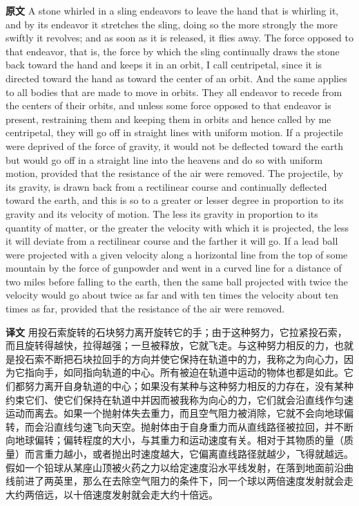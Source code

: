 \documentclass[UTF8,zihao=-4]{ctexart}
\begin{document}
\noindent\textbf{原文} A stone whirled in a sling endeavors to leave the hand that is whirling it, and by its endeavor it stretches the sling, doing so the more strongly the more swiftly it revolves; and as soon as it is released, it flies away. The force opposed to that endeavor, that is, the force by which the sling continually draws the stone back toward the hand and keeps it in an orbit, I call centripetal, since it is directed toward the hand as toward the center of an orbit. And the same applies to all bodies that are made to move in orbits. They all endeavor to recede from the centers of their orbits, and unless some force opposed to that endeavor is present, restraining them and keeping them in orbits and hence called by me centripetal, they will go off in straight lines with uniform motion. If a projectile were deprived of the force of gravity, it would not be deflected toward the earth but would go off in a straight line into the heavens and do so with uniform motion, provided that the resistance of the air were removed. The projectile, by its gravity, is drawn back from a rectilinear course and continually deflected toward the earth, and this is so to a greater or lesser degree in proportion to its gravity and its velocity of motion. The less its gravity in proportion to its quantity of matter, or the greater the velocity with which it is projected, the less it will deviate from a rectilinear course and the farther it will go. If a lead ball were projected with a given velocity along a horizontal line from the top of some mountain by the force of gunpowder and went in a curved line for a distance of two miles before falling to the earth, then the same ball projected with twice the velocity would go about twice as far and with ten times the velocity about ten times as far, provided that the resistance of the air were removed.
\par\noindent\textbf{译文} 用投石索旋转的石块努力离开旋转它的手；由于这种努力，它拉紧投石索，而且旋转得越快，拉得越强；一旦被释放，它就飞走。与这种努力相反的力，也就是投石索不断把石块拉回手的方向并使它保持在轨道中的力，我称之为向心力，因为它指向手，如同指向轨道的中心。所有被迫在轨道中运动的物体也都是如此。它们都努力离开自身轨道的中心；如果没有某种与这种努力相反的力存在，没有某种约束它们、使它们保持在轨道中并因而被我称为向心的力，它们就会沿直线作匀速运动而离去。如果一个抛射体失去重力，而且空气阻力被消除，它就不会向地球偏转，而会沿直线匀速飞向天空。抛射体由于自身重力而从直线路径被拉回，并不断向地球偏转；偏转程度的大小，与其重力和运动速度有关。相对于其物质的量（质量）而言重力越小，或者抛出时速度越大，它偏离直线路径就越少，飞得就越远。假如一个铅球从某座山顶被火药之力以给定速度沿水平线发射，在落到地面前沿曲线前进了两英里，那么在去除空气阻力的条件下，同一个球以两倍速度发射就会走大约两倍远，以十倍速度发射就会走大约十倍远。
\medskip
\end{document}
